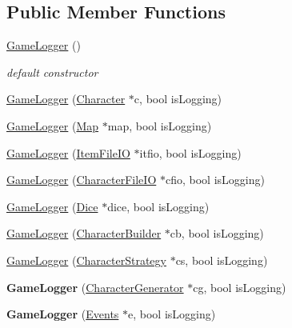 \subsection*{Public Member Functions}
\begin{DoxyCompactItemize}
\item 
\hypertarget{class_game_logger_a2728a3a5467b0ec0b7448ac9354bf201}{}\label{class_game_logger_a2728a3a5467b0ec0b7448ac9354bf201} 
\hyperlink{class_game_logger_a2728a3a5467b0ec0b7448ac9354bf201}{Game\+Logger} ()
\begin{DoxyCompactList}\small\item\em default constructor \end{DoxyCompactList}\item 
\hyperlink{class_game_logger_a68b94bcdd67467fd79baf38031685d5a}{Game\+Logger} (\hyperlink{class_character}{Character} $\ast$c, bool is\+Logging)
\item 
\hyperlink{class_game_logger_a2ef865c082fa50a3b6abafcc7fa8dae0}{Game\+Logger} (\hyperlink{class_map}{Map} $\ast$map, bool is\+Logging)
\item 
\hyperlink{class_game_logger_a719786a929f2eae0b1f948a71f427386}{Game\+Logger} (\hyperlink{class_item_file_i_o}{Item\+File\+IO} $\ast$itfio, bool is\+Logging)
\item 
\hyperlink{class_game_logger_a88b7807f40894cf85e927ccf438da485}{Game\+Logger} (\hyperlink{class_character_file_i_o}{Character\+File\+IO} $\ast$cfio, bool is\+Logging)
\item 
\hyperlink{class_game_logger_a93d74c59e640bada3e3c75169097c707}{Game\+Logger} (\hyperlink{class_dice}{Dice} $\ast$dice, bool is\+Logging)
\item 
\hyperlink{class_game_logger_a5d1efdad4b6b8dd65c9480acde00bd99}{Game\+Logger} (\hyperlink{class_character_builder}{Character\+Builder} $\ast$cb, bool is\+Logging)
\item 
\hyperlink{class_game_logger_a0807589f947226185269a45df60e7121}{Game\+Logger} (\hyperlink{class_character_strategy}{Character\+Strategy} $\ast$cs, bool is\+Logging)
\item 
\hypertarget{class_game_logger_aa97ad2505b9c909f07817e29b2c793f5}{}\label{class_game_logger_aa97ad2505b9c909f07817e29b2c793f5} 
{\bfseries Game\+Logger} (\hyperlink{class_character_generator}{Character\+Generator} $\ast$cg, bool is\+Logging)
\item 
\hypertarget{class_game_logger_a002ef2a678b77b408b074698f03f0669}{}\label{class_game_logger_a002ef2a678b77b408b074698f03f0669} 
{\bfseries Game\+Logger} (\hyperlink{class_events}{Events} $\ast$e, bool is\+Logging)

\end{DoxyCompactItemize}

